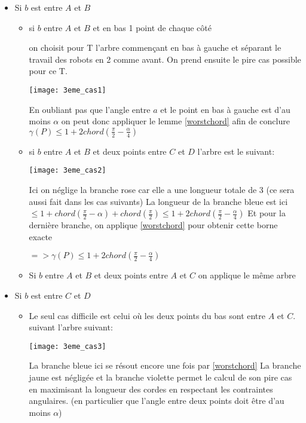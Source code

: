 \begin{itemize}

\item Si $b$ est entre $A$ et $B$

\begin{itemize}

\item si $b$ entre $A$ et $B$ et en bas 1 point de chaque côté

on choisit pour T l'arbre commençant en bas à gauche et séparant le travail des robots en 2 comme avant.
On prend ensuite le pire cas possible pour ce T.

\texttt{[image: 3eme\_cas1]}

En oubliant pas que l'angle entre $a$ et le point en bas à gauche est d'au moins $\alpha$ on peut donc appliquer le lemme \ref{worstchord} afin de conclure
$\gamma(P) \leq 1 + 2chord(\frac{\pi}{2} - \frac{\alpha}{4})$

\item si $b$ entre $A$ et $B$ et deux points entre $C$ et $D$
l'arbre est le suivant:

\texttt{[image: 3eme\_cas2]}

Ici on néglige la branche rose car elle a une longueur totale de 3 (ce sera aussi fait dans les cas suivants)
La longueur de la branche bleue est ici $\leq 1+chord\left(\frac{\pi}{2} - \alpha\right)+chord(\frac{\pi}{2}) \leq 1 + 2chord(\frac{\pi}{2} - \frac{\alpha}{4})$
Et pour la dernière branche, on applique \ref{worstchord} pour obtenir cette borne exacte

$=> \gamma(P) \leq 1 + 2chord(\frac{\pi}{2} - \frac{\alpha}{4})$

\item Si $b$ entre $A$ et $B$ et deux points entre $A$ et $C$ on applique le même arbre

\end{itemize}

\item Si $b$ est entre $C$ et $D$

\begin{itemize}

\item Le seul cas difficile est celui où les deux points du bas sont entre $A$ et $C$.
suivant l'arbre suivant:

\texttt{[image: 3eme\_cas3]}

La branche bleue ici se résout encore une fois par \ref{worstchord}
La branche jaune est négligée
et la branche violette permet le calcul de son pire cas en maximisant la longueur des cordes en respectant les contraintes angulaires. (en particulier que l'angle entre deux points doit être d'au moins $\alpha$)


\end{itemize}
\end{itemize}
